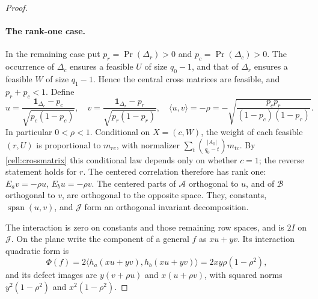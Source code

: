\begin{proof}
\paragraph{The rank-one case.}
In the remaining case put $p_r=\Pr(\Delta_r)>0$ and $p_c=\Pr(\Delta_c)>0$.
The occurrence of $\Delta_c$ ensures a feasible $U$ of size $q_0-1$, and that of
$\Delta_r$ ensures a feasible $W$ of size $q_1-1$. Hence the central cross matrices
are feasible, and $p_r+p_c<1$. Define
\[
 u=\frac{\mathbf 1_{\Delta_c}-p_c}{\sqrt{p_c(1-p_c)}},\quad
 v=\frac{\mathbf 1_{\Delta_r}-p_r}{\sqrt{p_r(1-p_r)}},\quad
 \langle u,v\rangle=-\rho=-\sqrt{\frac{p_cp_r}{(1-p_c)(1-p_r)}}.
\]
In particular $0<\rho<1$. Conditional on $X=(c,W)$, the weight of each
feasible $(r,U)$ is proportional to $m_{rc}$, with normalizer
$\sum_t\binom{|A_0|}{q_0-t}m_{tc}$. By \eqref{cell:crossmatrix} this
conditional law depends only on whether $c=1$; the reverse statement holds
for $r$. The centered correlation therefore has rank one:
$E_av=-\rho u$, $E_bu=-\rho v$. The centered parts of $\mathcal A$ orthogonal
to $u$, and of $\mathcal B$ orthogonal to $v$, are orthogonal to the opposite
space. They, constants, $\operatorname{span}(u,v)$, and $\mathcal J$ form an
orthogonal invariant decomposition.

The interaction is zero on constants and those remaining row spaces, and is
$2I$ on $\mathcal J$. On the plane write the component of a general $f$ as
$xu+yv$. Its interaction quadratic form is
\[
 \Phi(f)=2\langle h_a(xu+yv),h_b(xu+yv)\rangle
       =2xy\rho(1-\rho^2),
\]
and its defect images are $y(v+\rho u)$ and $x(u+\rho v)$, with squared norms
$y^2(1-\rho^2)$ and $x^2(1-\rho^2)$.


\end{proof}
